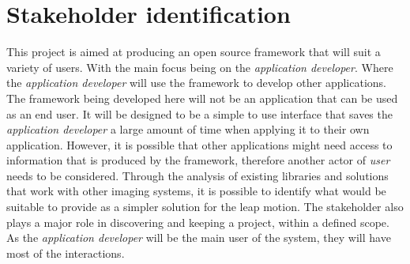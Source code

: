 \documentclass[11pt,oneside]{report}
\begin{document}
		\section{Stakeholder identification}
			This project is aimed at producing an open source framework that will suit a variety of users.
			With the main focus being on the \textit{application developer}.
			Where the \textit{application developer} will use the framework to develop other applications.
			The framework being developed here will not be an application that can be used as an end user.
			It will be designed to be a simple to use interface that saves the \textit{application developer} a large amount of time when applying it to their own application.
			However, it is possible that other applications might need access to information that is produced by the framework, therefore another actor of \textit{user} needs to be considered.
			Through the analysis of existing libraries and solutions that work with other imaging systems, it is possible to identify what would be suitable to provide as a simpler solution for the leap motion.
			The stakeholder also plays a major role in discovering and keeping a project, within a defined scope.
			As the \textit{application developer} will be the main user of the system, they will	have most of the interactions.
		
\end{document}

